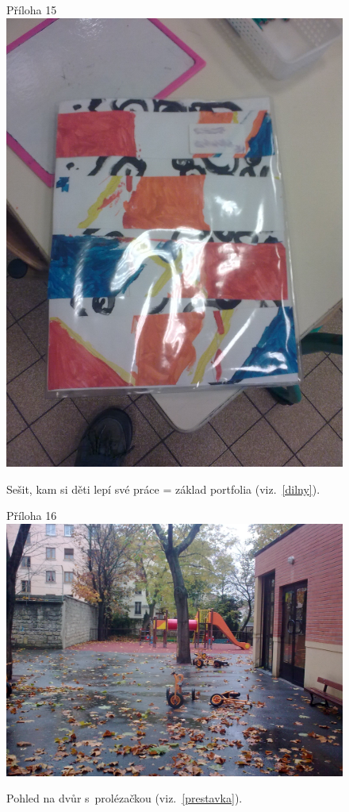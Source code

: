 	\begin{figure}[tb]
		\centering
		Příloha 15\\
		\includegraphics[height=0.35\textheight]{./fotky/Obr15.jpg}
		\caption{
			Sešit, kam si děti lepí své práce = základ portfolia (viz.~\ref{dilny}).
		}
		\label{Obr15}
	\end{figure}

	\begin{figure}[tb]
		\centering
		Příloha 16\\
		\includegraphics[height=0.35\textheight]{./fotky/Obr16.jpg}
		\caption{
			Pohled na dvůr s~prolézačkou (viz.~\ref{prestavka}).
		}
		\label{Obr16}
	\end{figure}

